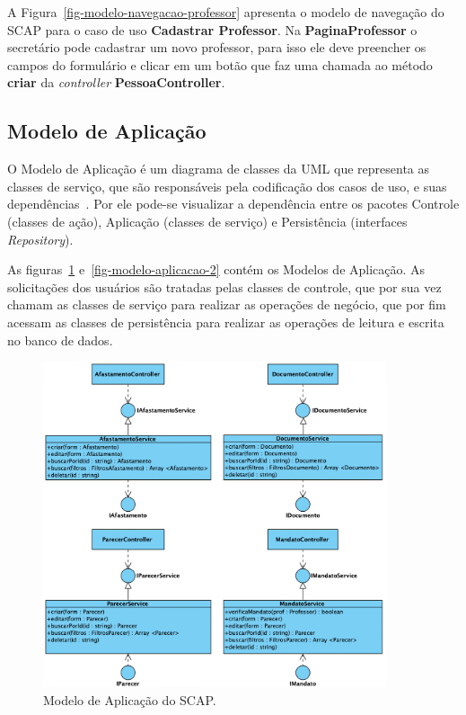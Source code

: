 A Figura~\ref{fig-modelo-navegacao-professor} apresenta o modelo de navegação do SCAP para o caso de uso
\textbf{Cadastrar Professor}. Na \textbf{PaginaProfessor} o secretário pode cadastrar um novo professor,
para isso ele deve preencher os campos do formulário e clicar em um botão que faz uma chamada ao método
\textbf{criar} da \textit{controller} \textbf{PessoaController}.



\subsection{Modelo de Aplicação}
\label{subsec-frameweb-aplicacao}
O Modelo de Aplicação é um diagrama de classes da UML que representa as classes de
serviço, que são responsáveis pela codificação dos casos de uso, e suas dependências~\cite{souza:2007}.
Por ele pode-se visualizar a dependência entre os pacotes Controle (classes de ação),
Aplicação (classes de serviço) e Persistência (interfaces \textit{Repository}). 

As figuras~\ref{fig-modelo-aplicacao-1} e~\ref{fig-modelo-aplicacao-2} contém os Modelos de Aplicação.
As solicitações dos usuários são tratadas pelas classes de controle, que por sua vez
chamam as classes de serviço para realizar as operações de negócio, que por fim acessam
as classes de persistência para realizar as operações de leitura e escrita no banco de dados.


\begin{figure}[h!]
    \centering
    \includegraphics[width=0.9\textwidth]{figuras/fig-modelo-apl-1.png}
    \caption{Modelo de Aplicação do SCAP.}
    \label{fig-modelo-aplicacao-1}
\end{figure}

